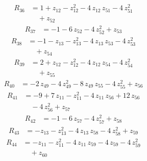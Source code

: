 \begin{equation*}\begin{aligned}
R_{36}&=1 +z_{12} -z_{12}^{2} -4\,z_{12}\,z_{51} -4\,z_{51}^{2} \\
&\quad +z_{52}
\end{aligned}\end{equation*}
\begin{equation*}\begin{aligned}
R_{37}&=-1 -6\,z_{52} -4\,z_{52}^{2} +z_{53}
\end{aligned}\end{equation*}
\begin{equation*}\begin{aligned}
R_{38}&=-1 -z_{13} -z_{13}^{2} -4\,z_{13}\,z_{53} -4\,z_{53}^{2} \\
&\quad +z_{54}
\end{aligned}\end{equation*}
\begin{equation*}\begin{aligned}
R_{39}&=2 +z_{12} -z_{12}^{2} -4\,z_{12}\,z_{54} -4\,z_{54}^{2} \\
&\quad +z_{55}
\end{aligned}\end{equation*}
\begin{equation*}\begin{aligned}
R_{40}&=-2\,z_{49} -4\,z_{49}^{2} -8\,z_{49}\,z_{55} -4\,z_{55}^{2} +z_{56}
\end{aligned}\end{equation*}
\begin{equation*}\begin{aligned}
R_{41}&=-9 +7\,z_{11} -z_{11}^{2} -4\,z_{11}\,z_{56} +12\,z_{56} \\
&\quad -4\,z_{56}^{2} +z_{57}
\end{aligned}\end{equation*}
\begin{equation*}\begin{aligned}
R_{42}&=-1 -6\,z_{57} -4\,z_{57}^{2} +z_{58}
\end{aligned}\end{equation*}
\begin{equation*}\begin{aligned}
R_{43}&=-z_{13} -z_{13}^{2} -4\,z_{13}\,z_{58} -4\,z_{58}^{2} +z_{59}
\end{aligned}\end{equation*}
\begin{equation*}\begin{aligned}
R_{44}&=-z_{11} -z_{11}^{2} -4\,z_{11}\,z_{59} -4\,z_{59} -4\,z_{59}^{2} \\
&\quad +z_{60}
\end{aligned}\end{equation*}
